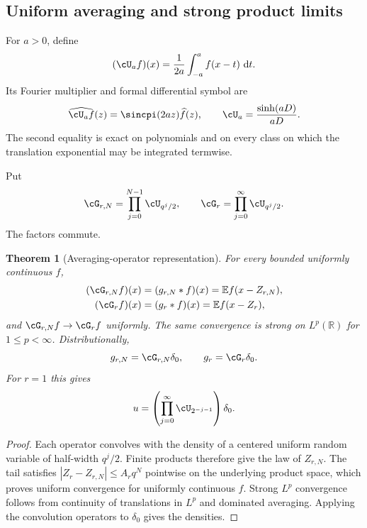 \documentclass[11pt,oneside]{article}
\newtheorem{theorem}{Theorem}[section]
\theoremstyle{definition}
\newcommand{\dd}{\,\mathrm d}
\newcommand{\E}{\mathbb E}
\newcommand{\R}{\mathbb R}
\begin{document}
\subsection{Uniform averaging and strong product limits}

For $a>0$, define
\begin{equation}
 (\cU_af)(x)=\frac1{2a}\int_{-a}^{a}f(x-t)\,\dd t.         \label{p2:eq:Ua-def}
\end{equation}
Its Fourier multiplier and formal differential symbol are
\begin{equation}
 \widehat{\cU_af}(z)=\sincpi(2az)\widehat f(z),
 \qquad
 \cU_a=\frac{\sinh(aD)}{aD}.                              \label{p2:eq:Ua-symbol}
\end{equation}
The second equality is exact on polynomials and on every class on which the
translation exponential may be integrated termwise.

Put
\begin{equation}
 \cG_{r,N}=\prod_{j=0}^{N-1}\cU_{q^j/2},
 \qquad
 \cG_r=\prod_{j=0}^{\infty}\cU_{q^j/2}.                  \label{p2:eq:Gr-operator}
\end{equation}
The factors commute.

\begin{theorem}[Averaging-operator representation]
\label{p2:thm:averaging-operator}
For every bounded uniformly continuous $f$,
\begin{align}
 (\cG_{r,N}f)(x)&=(g_{r,N}*f)(x)=\E f(x-Z_{r,N}),          \label{p2:eq:GrN-convolution}\\
 (\cG_rf)(x)&=(g_r*f)(x)=\E f(x-Z_r),                     \label{p2:eq:Gr-convolution}
\end{align}
and $\cG_{r,N}f\to\cG_rf$ uniformly.  The same convergence is strong on
$L^p(\R)$ for $1\le p<\infty$.  Distributionally,
\begin{equation}
 g_{r,N}=\cG_{r,N}\delta_0,
 \qquad
 g_r=\cG_r\delta_0.                                       \label{p2:eq:g-operator-delta}
\end{equation}
For $r=1$ this gives
\begin{equation}
 u=\left(\prod_{j=0}^{\infty}\cU_{2^{-j-1}}\right)\delta_0. \label{p2:eq:u-averaging-product}
\end{equation}
\end{theorem}

\begin{proof}
Each operator convolves with the density of a centered uniform random variable
of half-width $q^j/2$.  Finite products therefore give the law of $Z_{r,N}$.
The tail satisfies $|Z_r-Z_{r,N}|\le A_rq^N$ pointwise on the underlying
product space, which proves uniform convergence for uniformly continuous $f$.
Strong $L^p$ convergence follows from continuity of translations in $L^p$ and
dominated averaging.  Applying the convolution operators to $\delta_0$ gives
the densities.
\end{proof}
\end{document}
